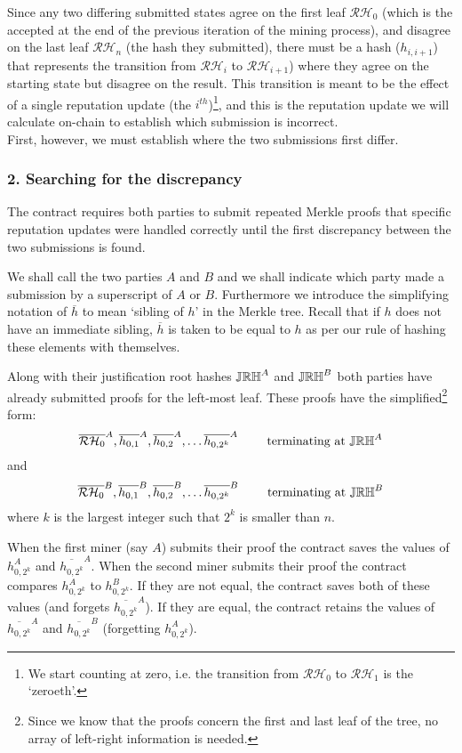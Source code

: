 Since any two differing submitted states agree on the first leaf $\mathcal{RH}_0$ (which is the  accepted at the end of the previous iteration of the mining process), and disagree on the last leaf $\mathcal{RH}_n$ (the hash they submitted), there must be a hash ($h_{i,i+1}$) that represents the transition from $\mathcal{RH}_i$ to $\mathcal{RH}_{i+1}$) where they agree on the starting state but disagree on the result. This transition is meant to be the effect of a single reputation update (the $i^{th}$)\footnote{We start counting at zero, i.e. the transition from $\mathcal{RH}_{0}$ to $\mathcal{RH}_{1}$ is the `zeroeth'.}, and this is the reputation update we will calculate on-chain to establish which submission is incorrect.\\

\noindent First, however, we must establish where the two submissions first differ.

\subsubsection*{2. Searching for the discrepancy}
The contract requires both parties to submit repeated Merkle proofs that specific reputation updates were handled correctly until the first discrepancy between the two submissions is found. 

We shall call the two parties $A$ and $B$ and we shall indicate which party made a submission by a superscript of $A$ or $B$. Furthermore we introduce the simplifying notation of $\overline{h}$ to mean `sibling of $h$' in the Merkle tree. Recall that if $h$ does not have an immediate sibling, $\overline{h}$ is taken to be equal to $h$ as per our rule of hashing these elements with themselves.

Along with their justification root hashes $\mathbb{JRH}^A$ and $\mathbb{JRH}^B$ both parties have already submitted proofs for the left-most leaf. These proofs have the simplified\footnote{Since we know that the proofs concern the first and last leaf of the tree, no array of left-right information is needed.} form:
\[
 \overline{\mathcal{RH}_0}^A, \overline{h_{0,1}}^A, \overline{h_{0,2}}^A, \ldots \overline{h_{0,2^k}}^A \qquad \textnormal{ terminating at } \mathbb{JRH}^A 
\]
and
\[
 \overline{\mathcal{RH}_0}^B, \overline{h_{0,1}}^B, \overline{h_{0,2}}^B, \ldots \overline{h_{0,2^k}}^B \qquad \textnormal{ terminating at } \mathbb{JRH}^B 
\]
where $k$ is the largest integer such that $2^k$ is smaller than $n$.

When the first miner (say $A$) submits their proof the contract saves the values of $h_{0,2^k}^A$ and $\overline{h_{0,2^k}}^A$. When the second miner submits their proof the contract compares $h_{0,2^k}^A$ to $h_{0,2^k}^B$. If they are not equal, the contract saves both of these values (and forgets $\overline{h_{0,2^k}}^A$). If they are equal, the contract retains the values of $\overline{h_{0,2^k}}^A$ and $\overline{h_{0,2^k}}^B$ (forgetting $h_{0,2^k}^A$).

